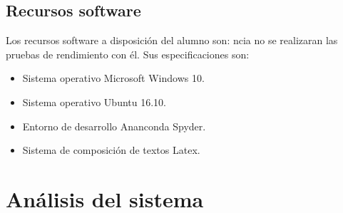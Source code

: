 \documentclass[a4paper, 12pt]{book}
\begin{document}
\subsection{Recursos software}
Los recursos software a disposición del alumno son:
ncia no se realizaran las pruebas de rendimiento con él. Sus especificaciones son:
        \begin{itemize}
            \item Sistema operativo Microsoft Windows 10.
            \item Sistema operativo Ubuntu 16.10.
            \item Entorno de desarrollo Ananconda Spyder.
            \item Sistema de composición de textos Latex.
    \end{itemize}

\newpage
\section{Análisis del sistema}
\newpage
\end{document}

